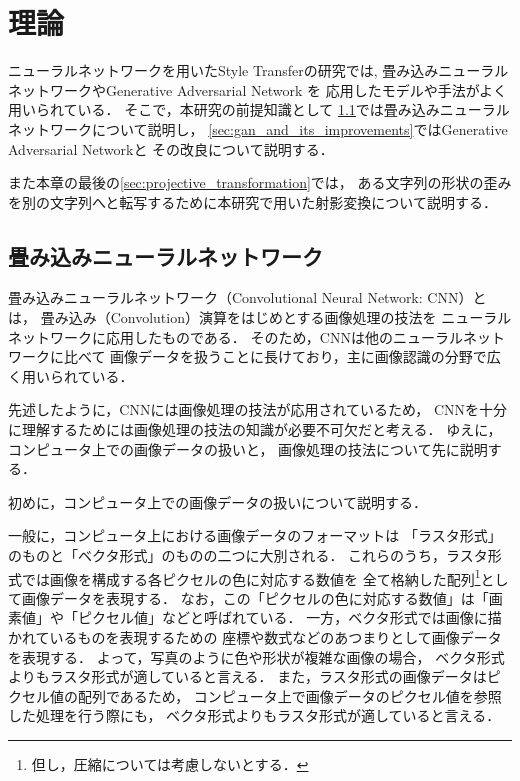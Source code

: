 \documentclass[\homedir/main.tex]{subfiles}
\begin{document}
\setcounter{chapter}{2}
\chapter{理論}\label{chap:theories}
ニューラルネットワークを用いたStyle Transferの研究では,
畳み込みニューラルネットワークやGenerative Adversarial Network を
応用したモデルや手法がよく用いられている．
そこで，本研究の前提知識として
\cref{sec:cnn}では畳み込みニューラルネットワークについて説明し，
\cref{sec:gan_and_its_improvements}ではGenerative Adversarial Networkと
その改良について説明する．

また本章の最後の\cref{sec:projective_transformation}では，
ある文字列の形状の歪みを別の文字列へと転写するために本研究で用いた射影変換について説明する．

\section{畳み込みニューラルネットワーク}\label{sec:cnn}
畳み込みニューラルネットワーク（Convolutional Neural Network: CNN）とは，
畳み込み（Convolution）演算をはじめとする画像処理の技法を
ニューラルネットワークに応用したものである．
そのため，CNNは他のニューラルネットワークに比べて
画像データを扱うことに長けており，主に画像認識の分野で広く用いられている．

先述したように，CNNには画像処理の技法が応用されているため，
CNNを十分に理解するためには画像処理の技法の知識が必要不可欠だと考える．
ゆえに，コンピュータ上での画像データの扱いと，
画像処理の技法について先に説明する．

初めに，コンピュータ上での画像データの扱いについて説明する．

一般に，コンピュータ上における画像データのフォーマットは
「ラスタ形式」のものと「ベクタ形式」のものの二つに大別される．
これらのうち，ラスタ形式では画像を構成する各ピクセルの色に対応する数値を
全て格納した配列\footnote{但し，圧縮については考慮しないとする．}として画像データを表現する．
なお，この「ピクセルの色に対応する数値」は「画素値」や「ピクセル値」などと呼ばれている．
一方，ベクタ形式では画像に描かれているものを表現するための
座標や数式などのあつまりとして画像データを表現する．
よって，写真のように色や形状が複雑な画像の場合，
ベクタ形式よりもラスタ形式が適していると言える．
また，ラスタ形式の画像データはピクセル値の配列であるため，
コンピュータ上で画像データのピクセル値を参照した処理を行う際にも，
ベクタ形式よりもラスタ形式が適していると言える．
\end{document}
